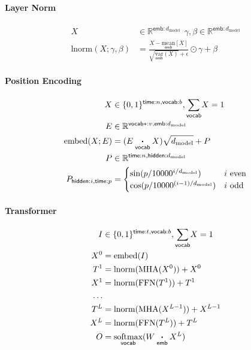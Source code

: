 \documentclass{article}
\newcommand{\reals}[0]{\mathbb{R}}
\newcommand{\name}[1]{\mathsf{#1}}
\newcommand{\ndot}[1]{\mathbin{\mathop{\thinspace\boldsymbol\cdot\thinspace}\displaylimits_{\name{#1}}}}
\newcommand{\nfun}[2]{\underset{\name{#1}}{#2}}
\newcommand{\nsum}[1]{\mathbin{\mathop{\sum}\displaylimits_{\name{#1}}}}
\newcommand{\ntup}[2]{\name{#1}:#2}
\newcommand{\dmodel}{d_{\text{model}}}
\begin{document}
\paragraph{Layer Norm}

\begin{align*} 
X &\in \reals^{{ \ntup{emb}{\dmodel}}} \ \  \gamma, \beta \in \reals^{{ \ntup{emb}{\dmodel}}} \\
\text{lnorm}(X; \gamma, \beta) &= \frac{X - \nfun{emb}{\text{mean}}[X]}{\sqrt{\nfun{emb}{\text{var}}(X)} + \epsilon } \odot \gamma + \beta 
\end{align*}

\paragraph{Position Encoding}
\begin{align*} 
X &\in \{0, 1\}^{{\ntup{time}{n}, \ntup{vocab}{b}}}, \nsum{vocab} X = 1\\
E &\in \reals^{{\ntup{vocab*}{v}, \ntup{emb}{\dmodel}}} \\
\text{embed}(X; E) &= (E \ndot{vocab} X)\sqrt{\dmodel} + P \\
P &\in \reals^{{\ntup{time}{n}, \ntup{hidden}{\dmodel}}} \\
P_{\name{hidden}:i, \name{time}:p} & = \begin{cases} \sin(p / 10000^{i / \dmodel}) & \text{$i$ even} \\ 
                                                     \cos(p / 10000^{(i - 1) / \dmodel}) & \text{$i$ odd} \\                                        \end{cases} \\
\end{align*}

\paragraph{Transformer}

\begin{align*} 
I &\in \{0, 1\}^{{\ntup{time}{t}, \ntup{vocab}{b}}}, \nsum{vocab} X = 1\\
X^0 &= \text{embed}(I)\\
T^1 &= \text{lnorm}(\text{MHA}(X^0)) + X^0\\
X^1 &= \text{lnorm}(\text{FFN}(T^1)) + T^1\\
\ldots \\
T^{L} &= \text{lnorm}(\text{MHA}(X^{L-1})) + X^{L-1}\\
X^{L} &= \text{lnorm}(\text{FFN}(T^L)) + T^L\\
O &= \nfun{vocab}{\text{softmax}}(W \ndot{emb} X^L)
\end{align*}







\end{document}
